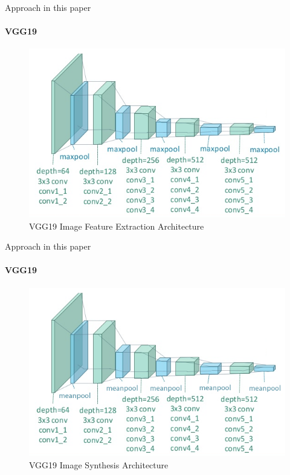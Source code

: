\documentclass{beamer}
\begin{document}
\begin{frame}{Approach in this paper}
\framesubtitle{VGG19}
\begin{figure}[H]
\centering
\includegraphics[width=.9\textwidth]{img/vgg19/feature-extraction}
\caption*{VGG19 Image Feature Extraction Architecture}
\end{figure}
\end{frame}



\begin{frame}{Approach in this paper}
\framesubtitle{VGG19}
\begin{figure}[H]
\centering
\includegraphics[width=.9\textwidth]{img/vgg19/synthesis}
\caption*{VGG19 Image Synthesis Architecture \cite{gatys2016image}}
\end{figure}
\end{frame}
\end{document}
